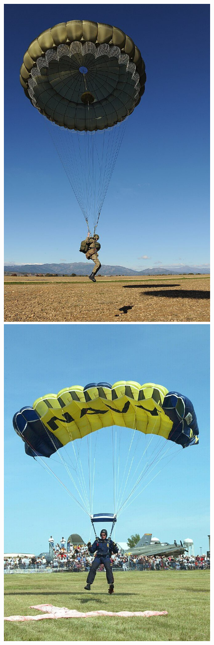 	\begin{center}
	\begin{minipage}[c]{1.0\linewidth}
	\begin{figure}[H]
	\begin{minipage}[c]{0.5\linewidth}
	\centering
	\includegraphics[width=0.7\linewidth]{01-EtudeAeronefs/img/paraMili.jpg}
	\end{minipage}
	\begin{minipage}[c]{0.5\linewidth}
	\centering
	\includegraphics[width=0.7\linewidth]{01-EtudeAeronefs/img/paraSport.jpg}

\end{minipage}
\end{figure}
\end{minipage}
\end{center}
